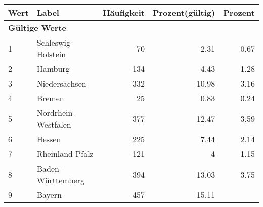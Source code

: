      \begin{longtable}{lXrrr}
     \toprule
     \textbf{Wert} & \textbf{Label} & \textbf{Häufigkeit} & \textbf{Prozent(gültig)} & \textbf{Prozent} \\
     \endhead
     \midrule
     \multicolumn{5}{l}{\textbf{Gültige Werte}}\\
        1 & \multicolumn{1}{X}{Schleswig-Holstein} & %
          \num{70} &
          \num[round-mode=places,round-precision=2]{2,31} &
          \num[round-mode=places,round-precision=2]{0,67} \\
        2 & \multicolumn{1}{X}{Hamburg} & %
          \num{134} &
          \num[round-mode=places,round-precision=2]{4,43} &
          \num[round-mode=places,round-precision=2]{1,28} \\
        3 & \multicolumn{1}{X}{Niedersachsen} & %
          \num{332} &
          \num[round-mode=places,round-precision=2]{10,98} &
          \num[round-mode=places,round-precision=2]{3,16} \\
        4 & \multicolumn{1}{X}{Bremen} & %
          \num{25} &
          \num[round-mode=places,round-precision=2]{0,83} &
          \num[round-mode=places,round-precision=2]{0,24} \\
        5 & \multicolumn{1}{X}{Nordrhein-Westfalen} & %
          \num{377} &
          \num[round-mode=places,round-precision=2]{12,47} &
          \num[round-mode=places,round-precision=2]{3,59} \\
        6 & \multicolumn{1}{X}{Hessen} & %
          \num{225} &
          \num[round-mode=places,round-precision=2]{7,44} &
          \num[round-mode=places,round-precision=2]{2,14} \\
        7 & \multicolumn{1}{X}{Rheinland-Pfalz} & %
          \num{121} &
          \num[round-mode=places,round-precision=2]{4} &
          \num[round-mode=places,round-precision=2]{1,15} \\
        8 & \multicolumn{1}{X}{Baden-Württemberg} & %
          \num{394} &
          \num[round-mode=places,round-precision=2]{13,03} &
          \num[round-mode=places,round-precision=2]{3,75} \\
        9 & \multicolumn{1}{X}{Bayern} & %
          \num{457} &
          \num[round-mode=places,round-precision=2]{15,11} &

\end{longtable}

